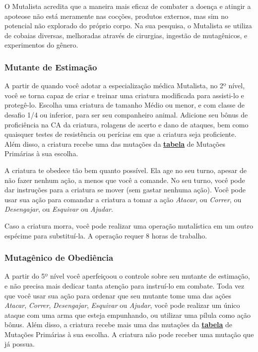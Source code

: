 \documentclass[letterpaper,twocolumn,openany]{dndbook}
\begin{document}
	O Mutalista acredita que a maneira mais eficaz de combater a doença e atingir a apoteose não está meramente nas cocções, produtos externos, mas sim no potencial não explorado do próprio corpo. Na sua pesquisa, o Mutalista se utiliza de cobaias diversas, melhoradas através de cirurgias, ingestão de mutagênicos, e experimentos do gênero.
	
	\subsubsection{Mutante de Estimação}
	A partir de quando você adotar a especialização médica Mutalista, no 2º nível, você se torna capaz de criar e treinar uma criatura modificada para assisti-lo e protegê-lo. Escolha uma criatura de tamanho Médio ou menor, e com classe de desafio 1/4 ou inferior, para ser seu companheiro animal. Adicione seu bônus de proficiência na CA da criatura, rolagens de acerto e dano de ataques, bem como quaisquer testes de resistência ou perícias em que a criatura seja proficiente. Além disso, a criatura recebe uma das mutações da \hyperref[tab:mutacoes_primarias]{\textbf{tabela}} de Mutações Primárias à sua escolha.
	\par A criatura te obedece tão bem quanto possível. Ela age no seu turno, apesar de não fazer nenhum ação, a menos que você a comande. No seu turno, você pode dar instruções para a criatura se mover (sem gastar nenhuma ação). Você pode usar sua ação para comandar a criatura a tomar a ação \textit{Atacar}, ou \textit{Correr}, ou \textit{Desengajar}, ou \textit{Esquivar} ou \textit{Ajudar}.
	\par Caso a criatura morra, você pode realizar uma operação mutalística em um outro espécime para substituí-la. A operação requer 8 horas de trabalho.
	
	\subsubsection{Mutagênico de Obediência}
	A partir do 5º nível você aperfeiçoou o controle sobre seu mutante de estimação, e não precisa mais dedicar tanta atenção para instruí-lo em combate. Toda vez que você usar sua ação para ordenar que seu mutante tome uma das ações \textit{Atacar}, \textit{Correr}, \textit{Desengajar}, \textit{Esquivar} ou \textit{Ajudar}, você pode realizar um único ataque com uma arma que esteja empunhando, ou utilizar uma pílula como ação bônus. Além disso, a criatura recebe mais uma das mutações da \hyperref[tab:mutacoes_primarias]{\textbf{tabela}} de Mutações Primárias à sua escolha. A criatura não pode receber uma mutação que já possua.
	
\end{document}
